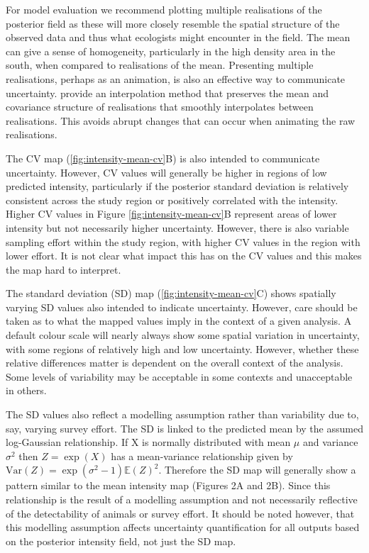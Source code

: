 \documentclass{statsoc}
\begin{document}
For model evaluation we recommend plotting multiple realisations of the posterior field as these will more closely resemble the spatial structure of the observed data and thus what ecologists might encounter in the field.  The mean can give a sense of homogeneity, particularly in the high density area in the south, when compared to realisations of the mean.  Presenting multiple realisations, perhaps as an animation, is also an effective way to communicate uncertainty. \cite{bowman_GraphicsUncertainty_2019a} provide an interpolation method that preserves the mean and covariance structure of realisations that smoothly interpolates between realisations.  This avoids abrupt changes that can occur when animating the raw realisations.  

The CV map (\autoref{fig:intensity-mean-cv}B) is also intended to communicate uncertainty.  However, CV values will generally be higher in regions of low predicted intensity, particularly if the posterior standard deviation is relatively consistent across the study region or positively correlated with the intensity.  Higher CV values in Figure \ref{fig:intensity-mean-cv}B represent areas of lower intensity but not necessarily higher uncertainty.  However, there is also variable sampling effort within the study region, with higher CV values in the region with lower effort.  It is not clear what impact this has on the CV values and this makes the map hard to interpret.

The standard deviation (SD) map (\autoref{fig:intensity-mean-cv}C) shows spatially varying SD values also intended to indicate uncertainty.  However, care should be taken as to what the mapped values imply in the context of a given analysis.  A default colour scale will nearly always show some spatial variation in uncertainty, with some regions of relatively high and low uncertainty.  However, whether these relative differences matter is dependent on the overall context of the analysis.  Some levels of variability may be acceptable in some contexts and unacceptable in others.

The SD values also reflect a modelling assumption rather than variability due to, say, varying survey effort.  The SD is linked to the predicted mean by the assumed log-Gaussian relationship.  If X is normally distributed with mean $\mu$ and variance $\sigma^2$ then $Z = \exp(X)$ has a mean-variance relationship given by $\text{Var}(Z) = \exp(\sigma^2 - 1)\mathbb{E}(Z)^2$. Therefore the SD map will generally show a pattern similar to the mean intensity map (Figures 2A and 2B).  Since this relationship is the result of a modelling assumption and not necessarily reflective of the detectability of animals or survey effort.  It should be noted however, that this modelling assumption affects uncertainty quantification for all outputs based on the posterior intensity field, not just the SD map.
\end{document}
